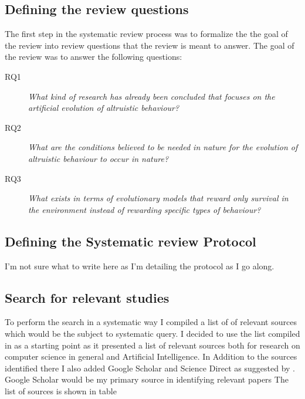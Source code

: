 \documentclass[a4paper]{book}
\begin{document}
\subsection{Defining the review questions}
The first step in the systematic review process was to formalize the the goal of the review into review questions that the review is meant to answer. The goal of the review was to answer the following questions:

\begin{description}
\item[RQ1] {\it What kind of research has already been concluded that focuses on the artificial evolution of altruistic behaviour?}

\item[RQ2] {\it What are the conditions believed to be needed in nature for the evolution of altruistic behaviour to occur in nature?}

\item[RQ3] {\it What exists in terms of evolutionary models that reward only survival in the environment instead of rewarding specific types of behaviour?}

\end{description}

\subsection{Defining the Systematic review Protocol}

I'm not sure what to write here as I'm detailing the protocol as I go along.

\subsection{Search for relevant studies}

To perform the search in a systematic way I compiled a list of of relevant sources which would be the subject to systematic query. I decided to use the list compiled in \cite{Lillegraven354464} as a starting point as it presented a list of relevant sources both for research on computer science in general and Artificial Intelligence. In Addition to the sources identified there I also added Google Scholar and Science Direct as suggested by 
\cite{Brereton2007571}. Google Scholar would be my primary source in identifying relevant papers The list of sources is shown in table 
 
\end{document}
